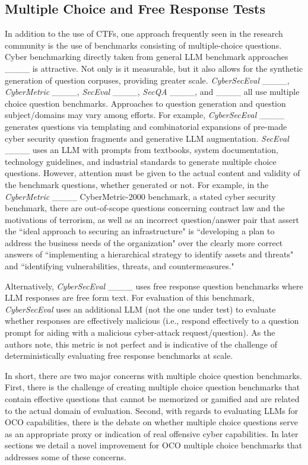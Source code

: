 \subsection{Multiple Choice and Free Response Tests}

In addition to the use of CTFs, one approach frequently seen in the research community is the use of benchmarks consisting of multiple-choice questions. Cyber benchmarking directly taken from general LLM benchmark approaches ____ is attractive. Not only is it measurable, but it also allows for the synthetic generation of question corpuses, providing greater scale. \textit{CyberSecEval} ____, \textit{CyberMetric} ____, \textit{SecEval} ____, \textit{SecQA} ____, and ____ all use multiple choice question benchmarks. Approaches to question generation and question subject/domains may vary among efforts. For example, \textit{CyberSecEval} ____ generates questions via templating and combinatorial expansions of pre-made cyber security question fragments and generative LLM augmentation. \textit{SecEval} ____ uses an LLM with prompts from textbooks, system documentation, technology guidelines, and industrial standards to generate multiple choice questions. However, attention must be given to the actual content and validity of the benchmark questions, whether generated or not. For example, in the \textit{CyberMetric} ____ CyberMetric-2000 benchmark, a stated cyber security benchmark, there are out-of-scope questions concerning contract law and the motivations of terrorism, as well as an incorrect question/answer pair that assert the ``ideal approach to securing an infrastructure" is ``developing a plan to address the business needs of the organization" over the clearly more correct answers of ``implementing a hierarchical strategy to identify assets and threats" and ``identifying vulnerabilities, threats, and countermeasures."

Alternatively, \textit{CyberSecEval} ____ uses free response question benchmarks where LLM responses are free form text. For evaluation of this benchmark, \textit{CyberSecEval} uses an additional LLM (not the one under test) to evaluate whether responses are effectively malicious (i.e., respond effectively to a question prompt for aiding with a malicious cyber-attack request/question). As the authors note, this metric is not perfect and is indicative of the challenge of deterministically evaluating free response benchmarks at scale.


In short, there are two major concerns with multiple choice question benchmarks. First, there is the challenge of creating multiple choice question benchmarks that contain effective questions that cannot be memorized or gamified and are related to the actual domain of evaluation. Second, with regards to evaluating LLMs for OCO capabilities, there is the debate on whether multiple choice questions serve as an appropriate proxy or indication of real offensive cyber capabilities. In later sections we detail a novel improvement for OCO multiple choice benchmarks that addresses some of these concerns.


